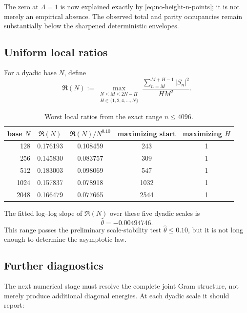 \documentclass[11pt]{article}
\theoremstyle{definition}
\theoremstyle{remark}
\newcommand{\1}{\mathbf{1}}
\begin{document}
The zero at $\Lambda=1$ is now explained exactly by
\cref{eq:no-height-n-points}; it is not merely an empirical absence.
The observed total and parity occupancies remain substantially below
the sharpened deterministic envelopes.

\subsection{Uniform local ratios}

For a dyadic base $N$, define
\begin{equation}
 \mathfrak R(N)
 :=
 \max_{\substack{
 N\le M\le2N-H\\
 H\in\{1,2,4,\ldots,N\}
 }}
 \frac{\sum_{n=M}^{M+H-1}|S_n|^2}{HM^2}.
 \label{eq:worst-local-ratio}
\end{equation}

\begin{table}[htbp]
\centering
\caption{Worst local ratios from the exact range $n\le4096$.}
\label{tab:local-ratios}
\small
\begin{tabular}{rcccc}
\toprule
base $N$ &
$\mathfrak R(N)$ &
$\mathfrak R(N)/N^{0.10}$ &
maximizing start &
maximizing $H$\\
\midrule
128  & 0.176193 & 0.108459 & 243  & 1\\
256  & 0.145830 & 0.083757 & 309  & 1\\
512  & 0.183003 & 0.098069 & 547  & 1\\
1024 & 0.157837 & 0.078918 & 1032 & 1\\
2048 & 0.166479 & 0.077665 & 2544 & 1\\
\bottomrule
\end{tabular}
\end{table}

The fitted log--log slope of $\mathfrak R(N)$ over these five dyadic
scales is
\begin{equation}
 \widehat\theta=-0.00494746.
 \label{eq:local-slope}
\end{equation}
This range passes the preliminary scale-stability test
$\widehat\theta\le0.10$, but it is not long enough to determine the
asymptotic law.

\subsection{Further diagnostics}

The next numerical stage must resolve the complete joint Gram structure, not merely
produce additional diagonal energies.  At each dyadic scale it should report:
\end{document}
